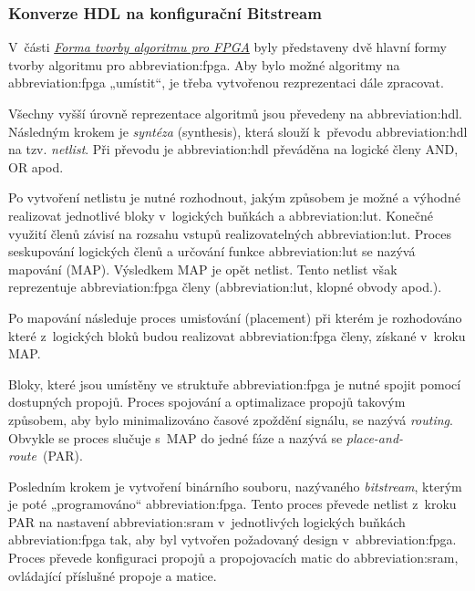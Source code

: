 \documentclass[a4paper, twoside, 11pt]{article}
\begin{document}
		\subsubsection{Konverze HDL na konfigurační Bitstream}
			V~části \hyperref[subsubsec:forma-tvorby-algoritmu-pro-fpga]{\textit{Forma tvorby algoritmu pro FPGA}} byly představeny dvě hlavní formy tvorby algoritmu pro \gls{abbreviation:fpga}. Aby bylo možné algoritmy na \gls{abbreviation:fpga} „umístit“, je třeba vytvořenou rezprezentaci dále zpracovat.\par
			Všechny vyšší úrovně reprezentace algoritmů jsou převedeny na \gls{abbreviation:hdl}. Následným krokem je \textit{syntéza} (synthesis), která slouží k~převodu \gls{abbreviation:hdl} na tzv. \textit{netlist}. Při převodu je \gls{abbreviation:hdl} převáděna na logické členy AND, OR apod. \cite{Sass2010}\par
			Po vytvoření netlistu je nutné rozhodnout, jakým způsobem je možné a výhodné realizovat jednotlivé bloky v~logických buňkách a \gls{abbreviation:lut}. Konečné využití členů závisí na rozsahu vstupů realizovatelných \gls{abbreviation:lut}. Proces seskupování logických členů a určování funkce \gls{abbreviation:lut} se nazývá mapování (MAP). Výsledkem MAP je opět netlist. Tento netlist však reprezentuje \gls{abbreviation:fpga} členy (\gls{abbreviation:lut}, klopné obvody apod.). \cite{Sass2010}\par
			Po mapování následuje proces umisťování (placement) při kterém je rozhodováno které z~logických bloků budou realizovat \gls{abbreviation:fpga} členy, získané v~kroku MAP. \cite{Sass2010}\par
			Bloky, které jsou umístěny ve struktuře \gls{abbreviation:fpga} je nutné spojit pomocí dostupných propojů. Proces spojování a optimalizace propojů takovým způsobem, aby bylo minimalizováno časové zpoždění signálu, se nazývá \textit{routing}. Obvykle se proces slučuje s~MAP do jedné fáze a nazývá se \textit{place-and-route}~(PAR). \cite{Sass2010} \par
			Posledním krokem je vytvoření binárního souboru, nazývaného \textit{bitstream}, kterým je poté „programováno“ \gls{abbreviation:fpga}. Tento proces převede netlist z~kroku PAR na nastavení \gls{abbreviation:sram} v~jednotlivých logických buňkách \gls{abbreviation:fpga} tak, aby byl vytvořen požadovaný design v~\gls{abbreviation:fpga}. Proces převede konfiguraci propojů a propojovacích matic do \gls{abbreviation:sram}, ovládající příslušné propoje a matice. \cite{Sass2010}\par
\end{document}
